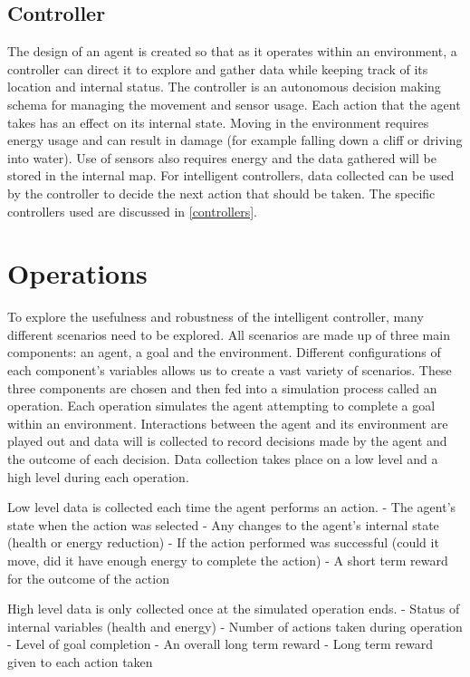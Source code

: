 \subsection{Controller}
The design of an agent is created so that as it operates within an environment, a controller can direct it to explore and gather data while keeping track of its location and internal status.
The controller is an autonomous decision making schema for managing the movement and sensor usage.
Each action that the agent takes has an effect on its internal state.
Moving in the environment requires energy usage and can result in damage (for example falling down a cliff or driving into water).
Use of sensors also requires energy and the data gathered will be stored in the internal map.
For intelligent controllers, data collected can be used by the controller to decide the next action that should be taken.
The specific controllers used are discussed in \ref{controllers}.




\section{Operations}
To explore the usefulness and robustness of the intelligent controller, many different scenarios need to be explored.
All scenarios are made up of three main components: an agent, a goal and the environment.
Different configurations of each component's variables allows us to create a vast variety of scenarios.
These three components are chosen and then fed into a simulation process called an operation. 
Each operation simulates the agent attempting to complete a goal within an environment.
Interactions between the agent and its environment are played out and data will is collected to record decisions made by the agent and the outcome of each decision.
Data collection takes place on a low level and a high level during each operation.

Low level data is collected each time the agent performs an action.
- The agent's state when the action was selected
- Any changes to the agent's internal state (health or energy reduction)
- If the action performed was successful (could it move, did it have enough energy to complete the action)
- A short term reward for the outcome of the action


High level data is only collected once at the simulated operation ends.
- Status of internal variables (health and energy)
- Number of actions taken during operation
- Level of goal completion
- An overall long term reward
- Long term reward given to each action taken



